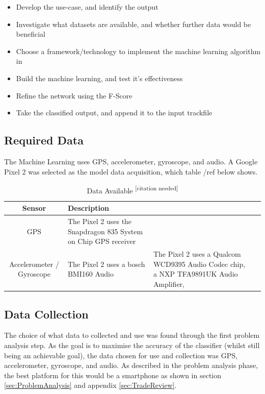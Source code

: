 \documentclass{UoNMCHA}
\newcommand{\citationneeded}{\textsuperscript{\color{blue} [citation needed]}}
\numberwithin{equation}{section}
\begin{document}
\begin{itemize}
    \item Develop the use-case, and identify the output
    \item Investigate what datasets are available, and whether further data would be beneficial
    \item Choose a framework/technology to implement the machine learning algorithm in
    \item Build the machine learning, and test it's effectiveness
    \item Refine the network using the F-Score
    \item Take the classified output, and append it to the input trackfile
\end{itemize}

\subsection{Required Data}
The Machine Learning uses GPS, accelerometer, gyroscope, and audio. A Google Pixel 2 was selected as the model data acquisition, which table /ref{} below shows.
\begin{table}[h!]
    \begin{center}
        \caption{Data Available\citationneeded}\label{tab:AndroidDataAvailable}
        {\footnotesize
            \begin{tabular}{c l l l|}
                \hline\hline Sensor & Description \\ \hline 
                GPS & The Pixel 2 uses the Snapdragon 835 System on Chip GPS receiver\\
                Accelerometer / Gyroscope & The Pixel 2 uses a bosch BMI160
                Audio & The Pixel 2 uses a Qualcom WCD9395 Audio Codec chip, a NXP TFA9891UK Audio Amplifier,
                \\ \hline
            \end{tabular}
        }
    \end{center}
\end{table}

\subsection{Data Collection}

The choice of what data to collected and use was found through the first problem analysis step. As the goal is to maximise the accuracy of the classifier (whilst still being an achievable goal), the data chosen for use and collection was GPS, accelerometer, gyroscope, and audio. As described in the problem analysis phase, the best platform for this would be a smartphone as shown in section \ref{sec:ProblemAnalysis} and appendix \ref{sec:TradeReview}. 
\end{document}
